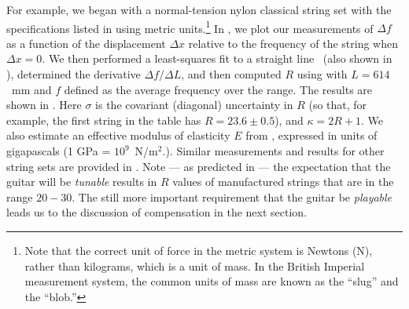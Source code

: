 For example, we began with a normal-tension nylon classical string set with the specifications listed in  using metric units.\footnote{Note that the correct unit of force in the metric system is Newtons (N), rather than kilograms, which is a unit of mass. In the British Imperial measurement system, the common units of mass are known as the ``slug'' and the ``blob.''} In , we plot our measurements of $\Delta f$ as a function of the displacement $\Delta x$ relative to the frequency of the string when $\Delta x = 0$. We then performed a least-squares fit to a straight line~\cite{ref:bevington2003dre} (also shown in ), determined the derivative $\Delta f / \Delta L$, and then computed $R$ using  with $L = 614$~mm and $f$ defined as the average frequency over the range. The results are shown in . Here $\sigma$ is the covariant (diagonal) uncertainty in $R$ (so that, for example, the first string in the table has $R = 23.6 \pm 0.5$), and $\kappa = 2 R + 1$. We also estimate an effective modulus of elasticity $E$ from , expressed in units of gigapascals (1 GPa = $10^9$~N/m$^2$.). Similar measurements and results for other string sets are provided in . Note --- as predicted in  --- the expectation that the guitar will be \emph{tunable} results in $R$ values of manufactured strings that are in the range $20 - 30$. The still more important requirement that the guitar be \emph{playable} leads us to the discussion of compensation in the next section.

